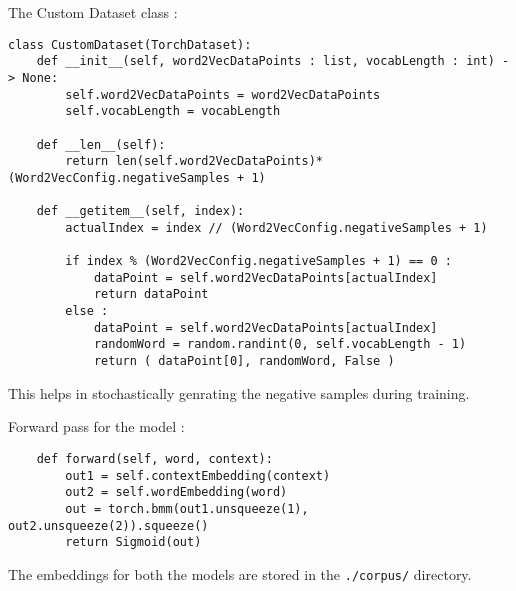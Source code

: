 The Custom Dataset class :
\begin{lstlisting}
class CustomDataset(TorchDataset):
    def __init__(self, word2VecDataPoints : list, vocabLength : int) -> None:
        self.word2VecDataPoints = word2VecDataPoints
        self.vocabLength = vocabLength
    
    def __len__(self):
        return len(self.word2VecDataPoints)*(Word2VecConfig.negativeSamples + 1)

    def __getitem__(self, index):
        actualIndex = index // (Word2VecConfig.negativeSamples + 1)

        if index % (Word2VecConfig.negativeSamples + 1) == 0 :
            dataPoint = self.word2VecDataPoints[actualIndex]
            return dataPoint
        else :
            dataPoint = self.word2VecDataPoints[actualIndex]
            randomWord = random.randint(0, self.vocabLength - 1)
            return ( dataPoint[0], randomWord, False )
\end{lstlisting}

This helps in stochastically genrating the negative samples during training.

Forward pass for the model : 

\begin{lstlisting}
    def forward(self, word, context):
        out1 = self.contextEmbedding(context)
        out2 = self.wordEmbedding(word)
        out = torch.bmm(out1.unsqueeze(1), out2.unsqueeze(2)).squeeze()
        return Sigmoid(out)
\end{lstlisting}

The embeddings for both the models are stored in the \verb|./corpus/| directory.
